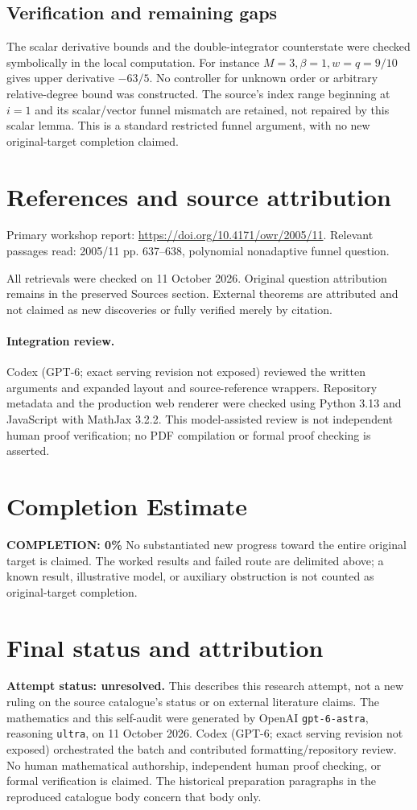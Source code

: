 \documentclass[11pt]{article}
\begin{document}
\subsection{Verification and remaining gaps}
The scalar derivative bounds and the double-integrator counterstate were checked symbolically in the local computation. For instance $M=3,\beta=1,w=q=9/10$ gives upper derivative $-63/5$. No controller for unknown order or arbitrary relative-degree bound was constructed. The source's index range beginning at $i=1$ and its scalar/vector funnel mismatch are retained, not repaired by this scalar lemma. This is a standard restricted funnel argument, with no new original-target completion claimed.

\section{References and source attribution}
Primary workshop report: \url{https://doi.org/10.4171/owr/2005/11}. Relevant passages read: 2005/11 pp. 637--638, polynomial nonadaptive funnel question.

All retrievals were checked on 11 October 2026. Original question attribution remains in the preserved Sources section. External theorems are attributed and not claimed as new discoveries or fully verified merely by citation.


\paragraph{Integration review.} Codex (GPT-6; exact serving revision not exposed) reviewed the written arguments and expanded layout and source-reference wrappers. Repository metadata and the production web renderer were checked using Python 3.13 and JavaScript with MathJax 3.2.2. This model-assisted review is not independent human proof verification; no PDF compilation or formal proof checking is asserted.

\section{Completion Estimate}
\noindent\textbf{COMPLETION: 0\%}
No substantiated new progress toward the entire original target is claimed. The worked results and failed route are delimited above; a known result, illustrative model, or auxiliary obstruction is not counted as original-target completion.

\section{Final status and attribution}
\textbf{Attempt status: unresolved.} This describes this research attempt, not a new ruling on the source catalogue's status or on external literature claims.
The mathematics and this self-audit were generated by OpenAI \texttt{gpt-6-astra}, reasoning \texttt{ultra}, on 11 October 2026. Codex (GPT-6; exact serving revision not exposed) orchestrated the batch and contributed formatting/repository review. No human mathematical authorship, independent human proof checking, or formal verification is claimed. The historical preparation paragraphs in the reproduced catalogue body concern that body only.
\end{document}
